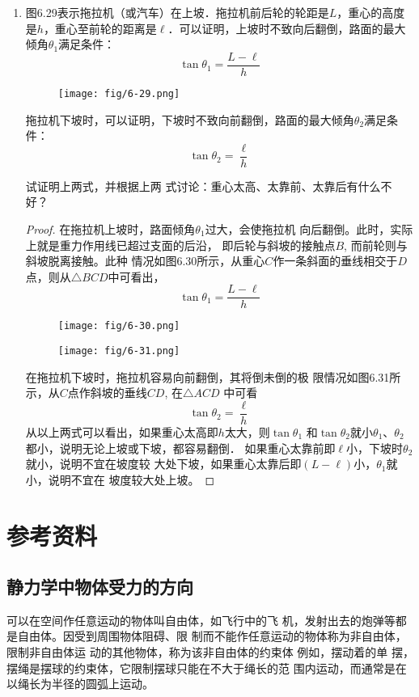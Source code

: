 \begin{enumerate}
\item  图6.29表示拖拉机（或汽车）在上坡．拖拉机前后轮的轮距是$L$，重心的高度是$h$，重心至前轮的距离是$\ell$．可以证明，上坡时不致向后翻倒，路面的最大倾角$\theta_1$满足条件：
\[\tan\theta_1=\frac{L-\ell}{h}\]
\begin{figure}[htp]
\centering\texttt{[image: fig/6-29.png]}
\caption{}
\end{figure}
拖拉机下坡时，可以证明，下坡时不致向前翻倒，路面的最大倾角$\theta_2$满足条件：
\[\tan\theta_2=\frac{\ell}{h}\]

试证明上两式，并根据上两
式讨论：重心太高、太靠前、太靠后有什么不好？

\begin{proof}
    在拖拉机上坡时，路面倾角$\theta_1$过大，会使拖拉机
    向后翻倒。此时，实际上就是重力作用线已超过支面的后沿，
    即后轮与斜坡的接触点$B$, 而前轮则与斜坡脱离接触。此种
    情况如图6.30所示，从重心$C$作一条斜面的垂线相交于$D$
    点，则从$\triangle BCD$中可看出，
\[\tan\theta_1=\frac{L-\ell}{h}\]
\begin{figure}[htp]\centering
    \begin{minipage}[t]{0.48\textwidth}
    \centering
\texttt{[image: fig/6-30.png]}
    \caption{}
    \end{minipage}
    \begin{minipage}[t]{0.48\textwidth}
    \centering
\texttt{[image: fig/6-31.png]}
    \caption{}
    \end{minipage}
    \end{figure}

    在拖拉机下坡时，拖拉机容易向前翻倒，其将倒未倒的极
    限情况如图6.31所示，从$C$点作斜坡的垂线$CD$, 在$\triangle ACD$
    中可看
\[\tan\theta_2=\frac{\ell }{h}\]
从以上两式可以看出，如果重心太高即$h$太大，则$\tan\theta_1$
和$\tan\theta_2$就小$\theta_1$、$\theta_2$都小，说明无论上坡或下坡，都容易翻倒．
如果重心太靠前即$\ell$小，下坡时$\theta_2$就小，说明不宜在坡度较
大处下坡，如果重心太靠后即$(L-\ell)$小，$\theta_1$就小，说明不宜在
坡度较大处上坡。
\end{proof}
\end{enumerate}



\section{参考资料}
\subsection{静力学中物体受力的方向}
可以在空间作任意运动的物体叫自由体，如飞行中的飞
机，发射出去的炮弹等都是自由体。因受到周围物体阻碍、限
制而不能作任意运动的物体称为非自由体，限制非自由体运
动的其他物体，称为该非自由体的约束体 例如，摆动着的单
摆，摆绳是摆球的约束体，它限制摆球只能在不大于绳长的范
围内运动，而通常是在以绳长为半径的圆弧上运动。

